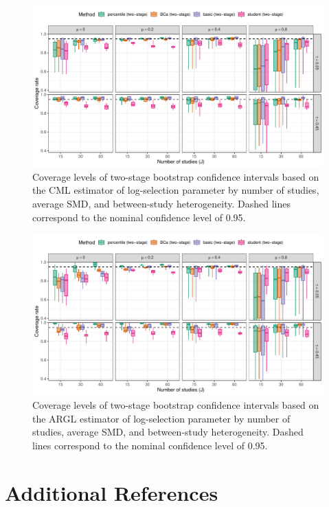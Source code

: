 \documentclass[
  american,
  man, donotrepeattitle,mask,floatsintext]{apa7}
\numberwithin{table}{section}
\numberwithin{equation}{section}
\numberwithin{figure}{section}
\begin{document}
\begin{figure}
\includegraphics{step-function-selection-models-supplementary-materials_files/figure-latex/CML-zeta-coverage-two-stage-1} \caption{Coverage levels of two-stage bootstrap confidence intervals based on the CML estimator of log-selection parameter by number of studies, average SMD, and between-study heterogeneity. Dashed lines correspond to the nominal confidence level of 0.95.}\label{fig:CML-zeta-coverage-two-stage}
\end{figure}

\begin{figure}
\includegraphics{step-function-selection-models-supplementary-materials_files/figure-latex/ARGL-zeta-coverage-two-stage-1} \caption{Coverage levels of two-stage bootstrap confidence intervals based on the ARGL estimator of log-selection parameter by number of studies, average SMD, and between-study heterogeneity. Dashed lines correspond to the nominal confidence level of 0.95.}\label{fig:ARGL-zeta-coverage-two-stage}
\end{figure}
\newpage

\section*{Additional References}\label{additional-references}
\end{document}
